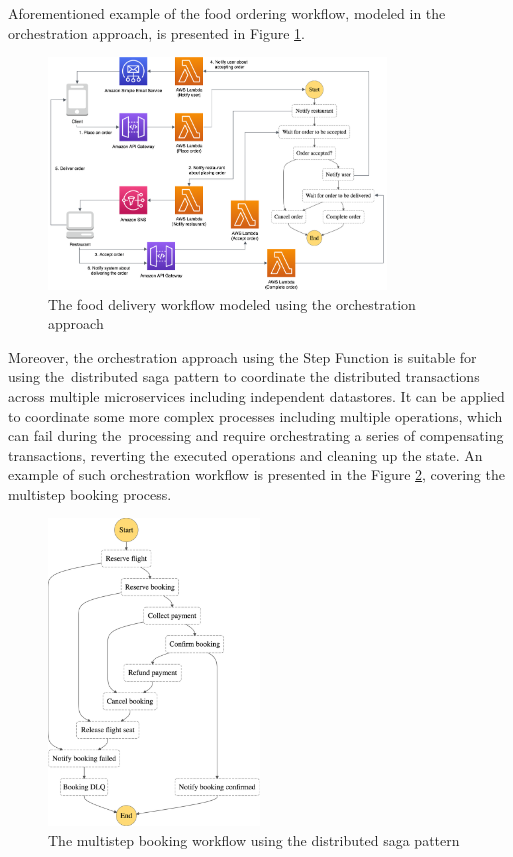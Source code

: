 Aforementioned example of the food ordering workflow, modeled in the orchestration approach, is presented in Figure \ref{fig:orchestration-diagram}.

\begin{figure}[H]
   \centering
   \includegraphics[width=0.8\textwidth]{assets/04-serverless-for-web-apps/orchestration.png}
   \caption{The food delivery workflow modeled using the orchestration approach}
   \label{fig:orchestration-diagram}
\end{figure}

Moreover, the orchestration approach using the Step Function is suitable for using the~distributed saga pattern \cite{SagaPattern} to coordinate the distributed transactions across multiple microservices including independent datastores.
It can be applied to coordinate some more complex processes including multiple operations, which can fail during the~processing and require orchestrating a series of compensating transactions, reverting the executed operations and cleaning up the state.
An example of such orchestration workflow is presented in the Figure \ref{fig:saga-orchestration-diagram}, covering the multistep booking process.

\begin{figure}[]
   \centering
   \includegraphics[width=0.5\textwidth]{assets/04-serverless-for-web-apps/saga.png}
   \caption{The multistep booking workflow using the distributed saga pattern}
   \label{fig:saga-orchestration-diagram}
\end{figure}

